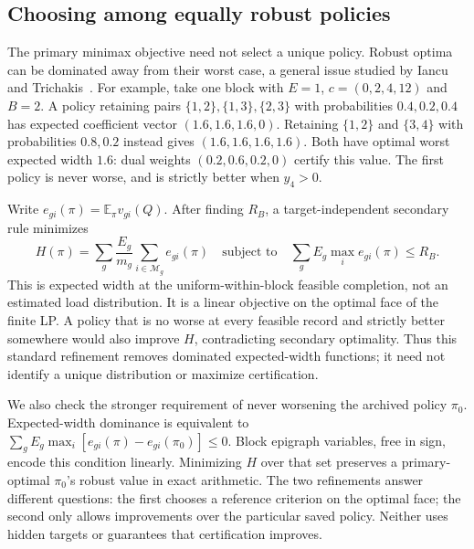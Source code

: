 \documentclass[12pt]{article}
\newcommand{\M}{\mathcal{M}}
\begin{document}
\subsection{Choosing among equally robust policies}\label{sec:tie-selection}
The primary minimax objective need not select a unique policy. Robust
optima can be dominated away from their worst case, a general issue studied
by Iancu and Trichakis~\cite{iancu2014}. For example, take one block with
$E=1$, $c=(0,2,4,12)$ and $B=2$. A policy retaining pairs
$\{1,2\},\{1,3\},\{2,3\}$ with probabilities $0.4,0.2,0.4$ has expected
coefficient vector $(1.6,1.6,1.6,0)$. Retaining $\{1,2\}$ and $\{3,4\}$
with probabilities $0.8,0.2$ instead gives $(1.6,1.6,1.6,1.6)$.
Both have optimal worst expected width $1.6$: dual weights
$(0.2,0.6,0.2,0)$ certify this value. The first policy is never worse,
and is strictly better when $y_4>0$.

Write $e_{gi}(\pi)=\mathbb E_\pi v_{gi}(Q)$. After finding $R_B$, a
target-independent secondary rule minimizes
\begin{equation}
 H(\pi)=\sum_g\frac{E_g}{m_g}\sum_{i\in\M_g} e_{gi}(\pi)
 \quad\text{subject to}\quad
 \sum_g E_g\max_i e_{gi}(\pi)\leq R_B.
 \label{eq:secondary-policy}
\end{equation}
This is expected width at the uniform-within-block feasible completion,
not an estimated load distribution. It is a linear objective on the
optimal face of the finite LP. A policy that is no worse at every feasible
record and strictly better somewhere would also improve $H$, contradicting
secondary optimality. Thus this standard refinement removes dominated
expected-width functions; it need not identify a unique distribution or
maximize certification.

We also check the stronger requirement of never worsening the archived
policy $\pi_0$. Expected-width dominance is equivalent to
$\sum_g E_g\max_i[e_{gi}(\pi)-e_{gi}(\pi_0)]\leq0$.
Block epigraph variables, free in sign, encode this condition linearly.
Minimizing $H$ over that set preserves a primary-optimal $\pi_0$'s robust
value in exact arithmetic. The two refinements answer different questions:
the first chooses a reference criterion on the optimal face; the second
only allows improvements over the particular saved policy. Neither uses
hidden targets or guarantees that certification improves.
\end{document}

